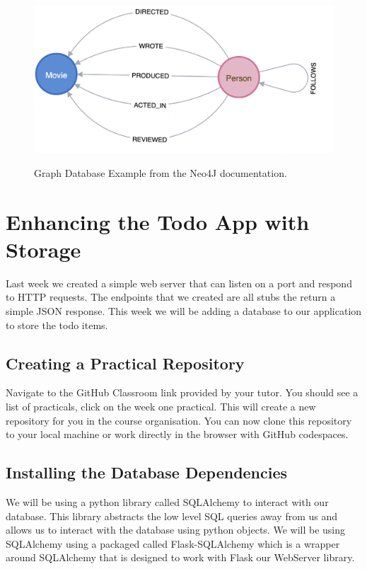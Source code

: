 \documentclass{csse4400}
\begin{document}
\begin{figure}[h]
  \href{https://neo4j.com/developer/example-project/}{
    \includegraphics[width=\textwidth]{images/graph}
  }
  \caption{Graph Database Example from the Neo4J documentation.}
\end{figure}

\section{Enhancing the Todo App with Storage}

Last week we created a simple web server that can listen on a port and respond to HTTP requests. The endpoints that we created are all stubs the return a simple JSON response. This week we will be adding a database to our application to store the todo items.

\subsection{Creating a Practical Repository}
Navigate to the GitHub Classroom link provided by your tutor.
You should see a list of practicals, click on the week one practical.
This will create a new repository for you in the course organisation.
You can now clone this repository to your local machine or work directly in the browser with GitHub codespaces.


\subsection{Installing the Database Dependencies}

We will be using a python library called SQLAlchemy to interact with our database. This library abstracts the low level SQL queries away from us and allows us to interact with the database using python objects. We will be using SQLAlchemy using a packaged called Flask-SQLAlchemy which is a wrapper around SQLAlchemy that is designed to work with Flask our WebServer library.
\end{document}

